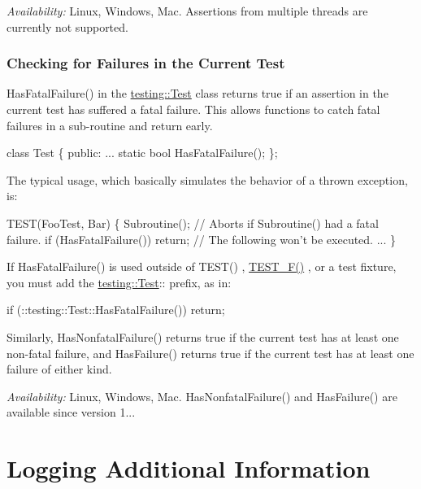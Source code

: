 {\itshape Availability\+:} Linux, Windows, Mac. Assertions from multiple threads are currently not supported.

\subsubsection*{Checking for Failures in the Current Test}

{\ttfamily Has\+Fatal\+Failure()} in the {\ttfamily \hyperlink{classtesting_1_1_test}{testing\+::\+Test}} class returns {\ttfamily true} if an assertion in the current test has suffered a fatal failure. This allows functions to catch fatal failures in a sub-\/routine and return early.


\begin{DoxyCode}
class Test \{
 public:
  ...
  static bool HasFatalFailure();
\};
\end{DoxyCode}


The typical usage, which basically simulates the behavior of a thrown exception, is\+:


\begin{DoxyCode}
TEST(FooTest, Bar) \{
  Subroutine();
  // Aborts if Subroutine() had a fatal failure.
  if (HasFatalFailure())
    return;
  // The following won't be executed.
  ...
\}
\end{DoxyCode}


If {\ttfamily Has\+Fatal\+Failure()} is used outside of {\ttfamily T\+E\+S\+T()} , {\ttfamily \hyperlink{test__tracker_8cpp_a567724948cdce4788a1e8c8baf6b6cfe}{T\+E\+S\+T\+\_\+\+F()}} , or a test fixture, you must add the {\ttfamily \hyperlink{classtesting_1_1_test}{testing\+::\+Test}\+:\+:} prefix, as in\+:


\begin{DoxyCode}
if (::testing::Test::HasFatalFailure())
  return;
\end{DoxyCode}


Similarly, {\ttfamily Has\+Nonfatal\+Failure()} returns {\ttfamily true} if the current test has at least one non-\/fatal failure, and {\ttfamily Has\+Failure()} returns {\ttfamily true} if the current test has at least one failure of either kind.

{\itshape Availability\+:} Linux, Windows, Mac. {\ttfamily Has\+Nonfatal\+Failure()} and {\ttfamily Has\+Failure()} are available since version 1...

\section*{Logging Additional Information}

